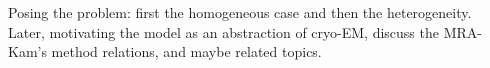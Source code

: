 \documentclass[12pt]{article}
\newcommand{\1}{\mathbf{1}}
\theoremstyle{plain}
\theoremstyle{definition}
\theoremstyle{remark}
\theoremstyle{plain}
\theoremstyle{remark}
\theoremstyle{plain}
\theoremstyle{plain}
\begin{document}
Posing the problem: first the homogeneous case and then the heterogeneity. Later, motivating the model as an abstraction of cryo-EM, discuss the MRA-Kam's method relations, and maybe related topics. 

%
%
%
%
\end{document}
